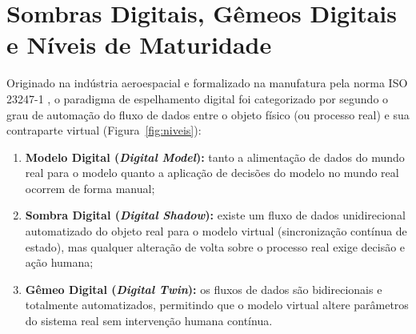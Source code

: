 \documentclass[12pt,openany,oneside,a4paper,english,brazilian,sumario=tradicional]{abntex2}
\begin{document}
\section{Sombras Digitais, Gêmeos Digitais e Níveis de Maturidade}\label{sec:gemeos}

Originado na indústria aeroespacial e formalizado na manufatura pela norma ISO 23247-1 \cite{iso23247}, o paradigma de espelhamento digital foi categorizado por  segundo o grau de automação do fluxo de dados entre o objeto físico (ou processo real) e sua contraparte virtual (Figura~\ref{fig:niveis}):

\begin{enumerate}
  \item \textbf{Modelo Digital (\textit{Digital Model}):} tanto a alimentação de dados do mundo real para o modelo quanto a aplicação de decisões do modelo no mundo real ocorrem de forma manual;
  \item \textbf{Sombra Digital (\textit{Digital Shadow}):} existe um fluxo de dados unidirecional automatizado do objeto real para o modelo virtual (sincronização contínua de estado), mas qualquer alteração de volta sobre o processo real exige decisão e ação humana;
  \item \textbf{Gêmeo Digital (\textit{Digital Twin}):} os fluxos de dados são bidirecionais e totalmente automatizados, permitindo que o modelo virtual altere parâmetros do sistema real sem intervenção humana contínua.
\end{enumerate}
\end{document}
